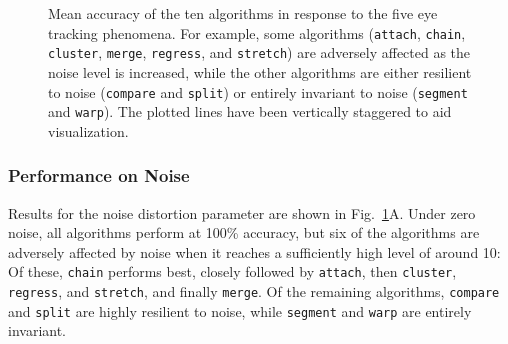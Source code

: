 \documentclass[doc,biblatex]{apa7}
\begin{document}
	\begin{figure}
	\vspace*{2pt}
	\caption{Mean accuracy of the ten algorithms in response to the five eye tracking phenomena. For example, some algorithms (\texttt{attach}, \texttt{chain}, \texttt{cluster}, \texttt{merge}, \texttt{regress}, and \texttt{stretch}) are adversely affected as the noise level is increased, while the other algorithms are either resilient to noise (\texttt{compare} and \texttt{split}) or entirely invariant to noise (\texttt{segment} and \texttt{warp}). The plotted lines have been vertically staggered to aid visualization.}
	\label{fig04}
	\end{figure}

\subsubsection{Performance on Noise}

Results for the noise distortion parameter are shown in Fig.~\ref{fig04}A. Under zero noise, all algorithms perform at 100\% accuracy, but six of the algorithms are adversely affected by noise when it reaches a sufficiently high level of around 10: Of these, \texttt{chain} performs best, closely followed by \texttt{attach}, then \texttt{cluster}, \texttt{regress}, and \texttt{stretch}, and finally \texttt{merge}. Of the remaining algorithms, \texttt{compare} and \texttt{split} are highly resilient to noise, while \texttt{segment} and \texttt{warp} are entirely invariant.
\end{document}
